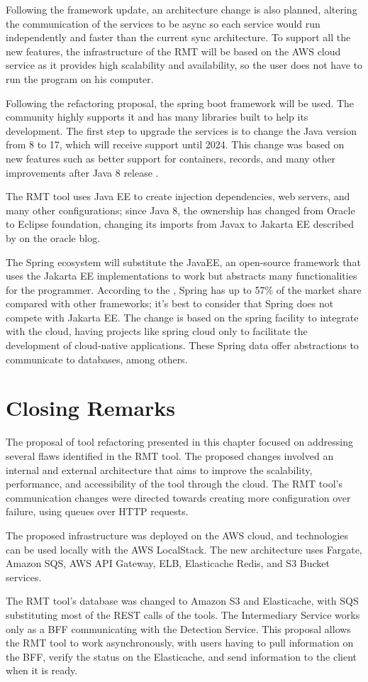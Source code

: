 Following the framework update, an architecture change is also planned, altering the communication of the services to be async so each service would run independently and faster than the current sync architecture. To support all the new features, the infrastructure of the RMT will be based on the AWS cloud service as it provides high scalability and availability, so the user does not have to run the program on his computer.

Following the refactoring proposal, the spring boot framework will be used. The community highly supports it and has many libraries built to help its development.
The first step to upgrade the services is to change the Java version from 8 to 17, which will receive support until 2024. This change was based on new features such as better support for containers, records, and many other improvements after Java 8 release \cite{java8to17}. 

The RMT tool uses Java EE to create injection dependencies, web servers, and many other configurations; since Java 8, the ownership has changed from Oracle to Eclipse foundation, changing its imports from Javax to Jakarta EE described by \textcite{java8to17} on the oracle blog.

The Spring ecosystem will substitute the JavaEE, an open-source framework that uses the Jakarta EE implementations to work but abstracts many functionalities for the programmer. According to the \textcite{javasurvey}, Spring has up to 57\% of the market share compared with other frameworks; it's best to consider that Spring does not compete with Jakarta EE. The change is based on the spring facility to integrate with the cloud, having projects like spring cloud only to facilitate the development of cloud-native applications. These Spring data offer abstractions to communicate to databases, among others.

\section{Closing Remarks}
\label{sec-closingproposal}
The proposal of tool refactoring presented in this chapter focused on addressing several flaws identified in the RMT tool. The proposed changes involved an internal and external architecture that aims to improve the scalability, performance, and accessibility of the tool through the cloud. The RMT tool's communication changes were directed towards creating more configuration over failure, using queues over HTTP requests. 

The proposed infrastructure was deployed on the AWS cloud, and technologies can be used locally with the AWS LocalStack. The new architecture uses Fargate, Amazon SQS, AWS API Gateway, ELB, Elasticache Redis, and S3 Bucket services. 

The RMT tool's database was changed to Amazon S3 and Elasticache, with SQS substituting most of the REST calls of the tools. The Intermediary Service works only as a BFF communicating with the Detection Service. This proposal allows the RMT tool to work asynchronously, with users having to pull information on the BFF, verify the status on the Elasticache, and send information to the client when it is ready.